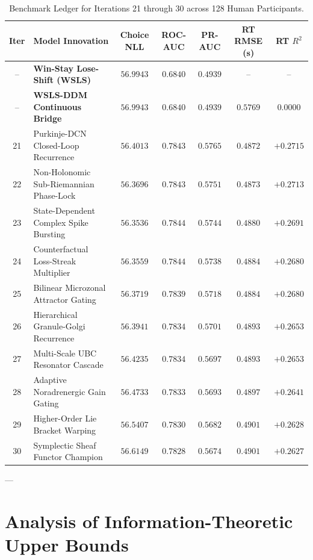 \documentclass[11pt,a4paper]{article}
\begin{document}
\begin{table}[H]
\centering
\caption{Benchmark Ledger for Iterations 21 through 30 across 128 Human Participants.}
\label{tab:extended_30_ledger}
\vspace{0.4em}
\scriptsize
\begin{tabular}{c l c c c c c}
\toprule
\textbf{Iter} & \textbf{Model Innovation} & \textbf{Choice NLL} & \textbf{ROC-AUC} & \textbf{PR-AUC} & \textbf{RT RMSE (s)} & \textbf{RT $R^2$} \\
\midrule
-- & \textbf{Win-Stay Lose-Shift (WSLS)} & $56.9943$ & $0.6840$ & $0.4939$ & -- & -- \\
-- & \textbf{WSLS-DDM Continuous Bridge} & $56.9943$ & $0.6840$ & $0.4939$ & $0.5769$ & $0.0000$ \\
\midrule
21 & Purkinje-DCN Closed-Loop Recurrence & $56.4013$ & $0.7843$ & $0.5765$ & $0.4872$ & $+0.2715$ \\
22 & Non-Holonomic Sub-Riemannian Phase-Lock & $56.3696$ & $0.7843$ & $0.5751$ & $0.4873$ & $+0.2713$ \\
23 & State-Dependent Complex Spike Bursting & $56.3536$ & $0.7844$ & $0.5744$ & $0.4880$ & $+0.2691$ \\
24 & Counterfactual Loss-Streak Multiplier & $56.3559$ & $0.7844$ & $0.5738$ & $0.4884$ & $+0.2680$ \\
25 & Bilinear Microzonal Attractor Gating & $56.3719$ & $0.7839$ & $0.5718$ & $0.4884$ & $+0.2680$ \\
26 & Hierarchical Granule-Golgi Recurrence & $56.3941$ & $0.7834$ & $0.5701$ & $0.4893$ & $+0.2653$ \\
27 & Multi-Scale UBC Resonator Cascade & $56.4235$ & $0.7834$ & $0.5697$ & $0.4893$ & $+0.2653$ \\
28 & Adaptive Noradrenergic Gain Gating & $56.4733$ & $0.7833$ & $0.5693$ & $0.4897$ & $+0.2641$ \\
29 & Higher-Order Lie Bracket Warping & $56.5407$ & $0.7830$ & $0.5682$ & $0.4901$ & $+0.2628$ \\
30 & Symplectic Sheaf Functor Champion & $56.6149$ & $0.7828$ & $0.5674$ & $0.4901$ & $+0.2627$ \\
\bottomrule
\end{tabular}
\end{table}

---

\section{Analysis of Information-Theoretic Upper Bounds}
\end{document}
